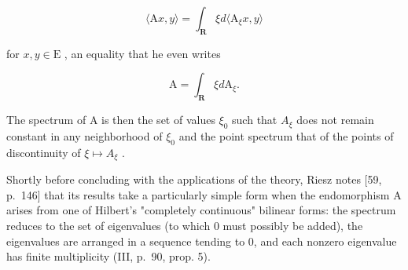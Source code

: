 \[
\langle \mathrm{A} x, y \rangle = \int_ {\mathbf {R}} \xi d \langle \mathrm{A} _ {\xi} x, y \rangle
\]

for \(x, y \in \mathrm{E}\) , an equality that he even writes

\[
\mathrm{A} = \int_ {\mathbf {R}} \xi d \mathrm{A} _ {\xi}.
\]

The spectrum of A is then the set of values \(\xi_{0}\) such that \(A_{\xi}\) does not remain constant in any neighborhood of \(\xi_{0}\) and the point spectrum that of the points of discontinuity of \(\xi \mapsto A_{\xi}\) .

Shortly before concluding with the applications of the theory, Riesz notes [59, p.~146] that its results take a particularly simple form when the endomorphism A arises from one of Hilbert's "completely continuous" bilinear forms: the spectrum reduces to the set of eigenvalues (to which 0 must possibly be added), the eigenvalues are arranged in a sequence tending to 0, and each nonzero eigenvalue has finite multiplicity (III, p.~90, prop. 5).

